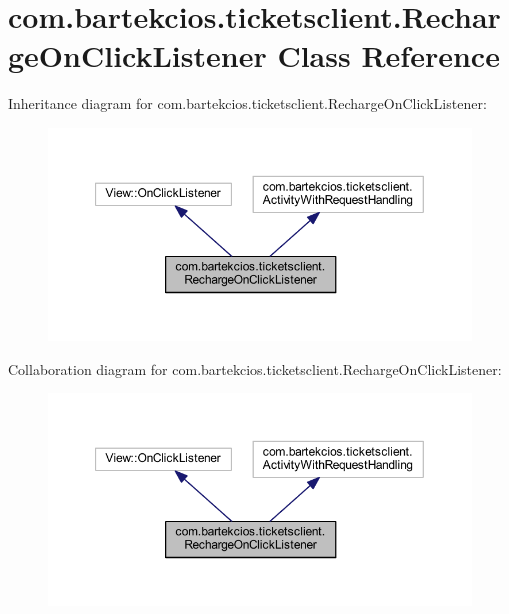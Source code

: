 \hypertarget{classcom_1_1bartekcios_1_1ticketsclient_1_1_recharge_on_click_listener}{}\section{com.\+bartekcios.\+ticketsclient.\+Recharge\+On\+Click\+Listener Class Reference}
\label{classcom_1_1bartekcios_1_1ticketsclient_1_1_recharge_on_click_listener}


Inheritance diagram for com.\+bartekcios.\+ticketsclient.\+Recharge\+On\+Click\+Listener\+:
\nopagebreak
\begin{figure}[H]
\begin{center}
\leavevmode
\includegraphics[width=350pt]{classcom_1_1bartekcios_1_1ticketsclient_1_1_recharge_on_click_listener__inherit__graph}
\end{center}
\end{figure}


Collaboration diagram for com.\+bartekcios.\+ticketsclient.\+Recharge\+On\+Click\+Listener\+:
\nopagebreak
\begin{figure}[H]
\begin{center}
\leavevmode
\includegraphics[width=350pt]{classcom_1_1bartekcios_1_1ticketsclient_1_1_recharge_on_click_listener__coll__graph}
\end{center}
\end{figure}
